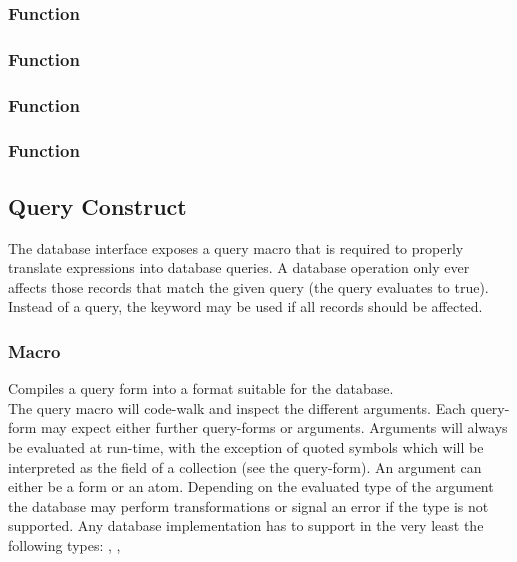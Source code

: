 \subsubsection{Function }

\subsubsection{Function }

\subsubsection{Function }

\subsubsection{Function }

\subsection{Query Construct}
The database interface exposes a query macro that is required to properly translate expressions into database queries. A database operation only ever affects those records that match the given query (the query evaluates to true). Instead of a query, the  keyword may be used if all records should be affected.

\subsubsection{Macro }
Compiles a query form into a format suitable for the database. \\

The query macro will code-walk and inspect the different arguments. Each query-form may expect either further query-forms or arguments. Arguments will always be evaluated at run-time, with the exception of quoted symbols which will be interpreted as the field of a collection (see the  query-form). An argument can either be a form or an atom. Depending on the evaluated type of the argument the database may perform transformations or signal an error if the type is not supported. Any database implementation has to support in the very least the following types: , ,  \\

